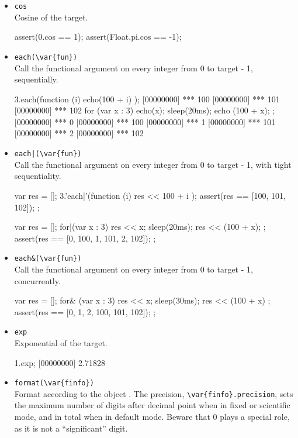 \begin{itemize}
\item \lstinline|cos|\\
  Cosine of the target.
\begin{urbiscript}[firstnumber=last]
assert(0.cos == 1);
assert(Float.pi.cos == -1);
\end{urbiscript}

\item \lstinline|each(\var{fun})|\\
  Call the functional argument  on every integer from 0 to
  target - 1, sequentially.
\begin{urbiscript}[firstnumber=last]
3.each(function (i) { echo(100 + i) });
[00000000] *** 100
[00000000] *** 101
[00000000] *** 102
for (var x : 3) { echo(x); sleep(20ms); echo (100 + x); };
[00000000] *** 0
[00000000] *** 100
[00000000] *** 1
[00000000] *** 101
[00000000] *** 2
[00000000] *** 102
\end{urbiscript}

\item \lstinline'each|(\var{fun})'\\
  Call the functional argument  on every integer from 0 to
  target - 1, with tight sequentiality.
\begin{urbiscript}[firstnumber=last]
{
  var res = [];
  3.'each|'(function (i) { res << 100 + i });
  assert(res == [100, 101, 102]);
};

{
  var res = [];
  for|(var x : 3) { res << x; sleep(20ms); res << (100 + x); };
  assert(res == [0, 100, 1, 101, 2, 102]);
};
\end{urbiscript}%

\item \lstinline|each&(\var{fun})|\\
  Call the functional argument  on every integer from 0 to
  target - 1, concurrently.
\begin{urbiscript}[firstnumber=last]
{
  var res = [];
  for& (var x : 3) { res << x; sleep(30ms); res << (100 + x) };
  assert(res == [0, 1, 2, 100, 101, 102]);
};
\end{urbiscript}%

\item \lstinline|exp|\\
  Exponential of the target.
\begin{urbiscript}[firstnumber=last]
1.exp;
[00000000] 2.71828
\end{urbiscript}

\item \lstinline|format(\var{finfo})|\\
  Format according to the  object .
  The precision, \lstinline|\var{finfo}.precision|, sets the maximum
  number of digits after decimal point when in fixed or scientific
  mode, and in total when in default mode.  Beware that 0 plays a
  special role, as it is not a ``significant'' digit.


\end{itemize}
